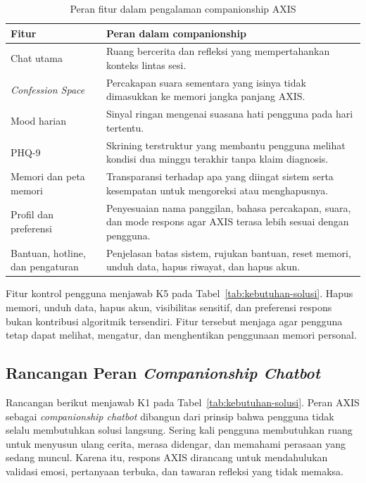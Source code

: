 \begin{table}[!htbp]
\centering
\caption{Peran fitur dalam pengalaman companionship AXIS}
\label{tab:peran-fitur-companionship}
{\footnotesize
\begin{tabularx}{\textwidth}{|>{\raggedright\arraybackslash}p{3.2cm}|>{\raggedright\arraybackslash}X|}
\hline
\rowcolor{tableheadgray}
\textbf{Fitur} & \textbf{Peran dalam companionship} \\
\hline
Chat utama & Ruang bercerita dan refleksi yang mempertahankan konteks lintas sesi. \\
\hline
\textit{Confession Space} & Percakapan suara sementara yang isinya tidak dimasukkan ke memori jangka panjang AXIS. \\
\hline
Mood harian & Sinyal ringan mengenai suasana hati pengguna pada hari tertentu. \\
\hline
PHQ-9 & Skrining terstruktur yang membantu pengguna melihat kondisi dua minggu terakhir tanpa klaim diagnosis. \\
\hline
Memori dan peta memori & Transparansi terhadap apa yang diingat sistem serta kesempatan untuk mengoreksi atau menghapusnya. \\
\hline
Profil dan preferensi & Penyesuaian nama panggilan, bahasa percakapan, suara, dan mode respons agar AXIS terasa lebih sesuai dengan pengguna. \\
\hline
Bantuan, hotline, dan pengaturan & Penjelasan batas sistem, rujukan bantuan, reset memori, unduh data, hapus riwayat, dan hapus akun. \\
\hline
\end{tabularx}
}
\end{table}

Fitur kontrol pengguna menjawab K5 pada Tabel~\ref{tab:kebutuhan-solusi}. Hapus memori, unduh data, hapus akun, visibilitas sensitif, dan preferensi respons bukan kontribusi algoritmik tersendiri. Fitur tersebut menjaga agar pengguna tetap dapat melihat, mengatur, dan menghentikan penggunaan memori personal.

\subsection{Rancangan Peran \textit{Companionship Chatbot}}
\label{sec:rancangan-companionship}

Rancangan berikut menjawab K1 pada Tabel~\ref{tab:kebutuhan-solusi}. Peran AXIS sebagai \textit{companionship chatbot} dibangun dari prinsip bahwa pengguna tidak selalu membutuhkan solusi langsung. Sering kali pengguna membutuhkan ruang untuk menyusun ulang cerita, merasa didengar, dan memahami perasaan yang sedang muncul. Karena itu, respons AXIS dirancang untuk mendahulukan validasi emosi, pertanyaan terbuka, dan tawaran refleksi yang tidak memaksa.

